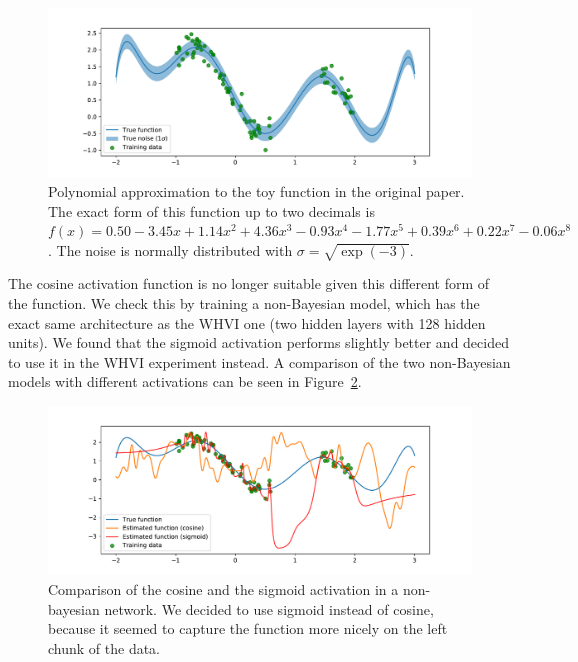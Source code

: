 \documentclass[11pt, twocolumn]{article}
\begin{document}
    \begin{figure}[h]
        \centering
        \includegraphics[width=1.0\hsize]{img/toy-function.pdf}
        \caption{Polynomial approximation to the toy function in the original paper.
        The exact form of this function up to two decimals is $f(x) = 0.50 -3.45x + 1.14x^2 + 4.36x^3 -0.93x^4 -1.77x^5 + 0.39x^6 + 0.22x^7 -0.06x^8$. The noise is normally distributed with $\sigma = \sqrt{\exp (-3)}$.
        }
        \label{fig:toy-function}
    \end{figure}

    The cosine activation function is no longer suitable given this different form of the function.
    We check this by training a non-Bayesian model, which has the exact same architecture as the WHVI one (two hidden layers with 128 hidden units).
    We found that the sigmoid activation performs slightly better and decided to use it in the WHVI experiment instead.
    A comparison of the two non-Bayesian models with different activations can be seen in Figure~\ref{fig:toy-function-non-bayesian}.

    \begin{figure}
        \centering
        \includegraphics[width=1.0\hsize]{img/toy-function-non-bayesian.pdf}
        \caption{Comparison of the cosine and the sigmoid activation in a non-bayesian network.
        We decided to use sigmoid instead of cosine, because it seemed to capture the function more nicely on the left chunk of the data.}
        \label{fig:toy-function-non-bayesian}
    \end{figure}
\end{document}
